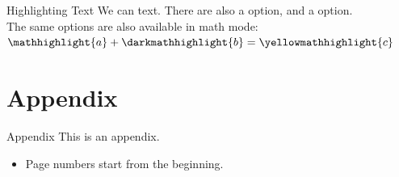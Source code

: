 \documentclass[aspectratio=169]{beamer} %
\begin{document}
\begin{frame}{Highlighting Text}
    We can  text. There are also a  option, and a  option.\\
    The same options are also available in math mode: $\mathhighlight{a} + \darkmathhighlight{b} = \yellowmathhighlight{c}$
\end{frame}


\appendix

\section{Appendix}

\begin{frame}{Appendix}
    This is an appendix.
    \begin{itemize}
        \item Page numbers start from the beginning.
    \end{itemize}
\end{frame}
\end{document}

